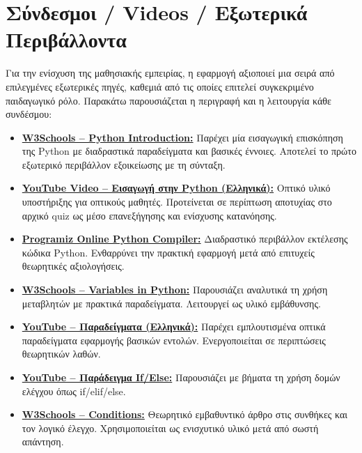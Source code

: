 \documentclass[11pt]{report}
\begin{document}
\section{Σύνδεσμοι / Videos / Εξωτερικά Περιβάλλοντα}

Για την ενίσχυση της μαθησιακής εμπειρίας, η εφαρμογή αξιοποιεί μια σειρά από επιλεγμένες εξωτερικές πηγές, καθεμιά από τις οποίες επιτελεί συγκεκριμένο παιδαγωγικό ρόλο. Παρακάτω παρουσιάζεται η περιγραφή και η λειτουργία κάθε συνδέσμου:

\begin{itemize}
    \item \href{https://www.w3schools.com/python/python_intro.asp}{\textbf{W3Schools – Python Introduction:}} Παρέχει μία εισαγωγική επισκόπηση της Python με διαδραστικά παραδείγματα και βασικές έννοιες. Αποτελεί το πρώτο εξωτερικό περιβάλλον εξοικείωσης με τη σύνταξη.
    
    \item \href{https://www.youtube.com/watch?v=6i3e-j3wSf0}{\textbf{YouTube Video – Εισαγωγή στην Python (Ελληνικά):}} Οπτικό υλικό υποστήριξης για οπτικούς μαθητές. Προτείνεται σε περίπτωση αποτυχίας στο αρχικό quiz ως μέσο επανεξήγησης και ενίσχυσης κατανόησης.
    
    \item \href{https://www.programiz.com/python-programming/online-compiler/}{\textbf{Programiz Online Python Compiler:}} Διαδραστικό περιβάλλον εκτέλεσης κώδικα Python. Ενθαρρύνει την πρακτική εφαρμογή μετά από επιτυχείς θεωρητικές αξιολογήσεις.
    
    \item \href{https://www.w3schools.com/python/python_variables.asp}{\textbf{W3Schools – Variables in Python:}} Παρουσιάζει αναλυτικά τη χρήση μεταβλητών με πρακτικά παραδείγματα. Λειτουργεί ως υλικό εμβάθυνσης.
    
    \item \href{https://www.youtube.com/watch?v=fLAfa-BQtOQ}{\textbf{YouTube – Παραδείγματα (Ελληνικά):}} Παρέχει εμπλουτισμένα οπτικά παραδείγματα εφαρμογής βασικών εντολών. Ενεργοποιείται σε περιπτώσεις θεωρητικών λαθών.
    
    \item \href{https://www.youtube.com/watch?v=23vCap6iYSs}{\textbf{YouTube – Παράδειγμα If/Else:}} Παρουσιάζει με βήματα τη χρήση δομών ελέγχου όπως if/elif/else.
    
    \item \href{https://www.w3schools.com/python/python_conditions.asp}{\textbf{W3Schools – Conditions:}} Θεωρητικό εμβαθυντικό άρθρο στις συνθήκες και τον λογικό έλεγχο. Χρησιμοποιείται ως ενισχυτικό υλικό μετά από σωστή απάντηση.
    

\end{itemize}
\end{document}

